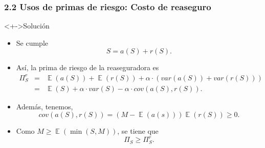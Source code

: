 \documentclass[cjk,t,compress]{beamer}
\newcommand{\field}[1]{\mathbb{#1}}
\newcommand{\expec}{\operatorname{\field{E}}}
\renewcommand{\min}{\operatorname{\text{min}}}
\begin{document}
\begin{frame}[fragile]
	\frametitle{2.2 Usos de primas de riesgo: Costo de reaseguro}
	\scriptsize  	
		
		\vspace{0.1cm}
		\begin{block}<+->{Soluci\'on}
		\vspace{0.3cm}
		\begin{itemize}
		  \item Se cumple
		  \begin{equation}
		 	S = a(S)+r(S).
			\nonumber
		  \end{equation}
		  \item As\'i, la prima de riesgo de la reaseguradora es
		  \begin{eqnarray}
		    \Pi^{r}_{S} 
		    		& = & 
		    		\expec\left(a(S)\right) 
		    		+ \expec \left(r(S)\right)
		    		+ \alpha 
		    		\cdot 
		    		\left( var\left(a(S)\right) + var\left(r(S)\right) \right)
		    		\nonumber \\
		    		& = &
		    		\expec(S) 
		    		+ \alpha \cdot var(S)
		    		- \alpha \cdot cov\left(a(S),r(S)\right). 
		    		\nonumber
		  \end{eqnarray}
		  \item Adem\'as, tenemos,
		  \begin{equation}
		    cov\left(a(S),r(S)\right) = \left(M-\expec(a(s))\right)\expec(r(S)) \geq 0.
		    \nonumber
		  \end{equation}
		  \item Como $M \geq \expec\left(\min(S,M)\right)$,
		  se tiene que 
		  \begin{equation}
		  \Pi_{S} \geq \Pi^{r}_{S}.
		  \nonumber
		  \end{equation}
		\end{itemize}
		\end{block}
		  	
\end{frame}
\end{document}
